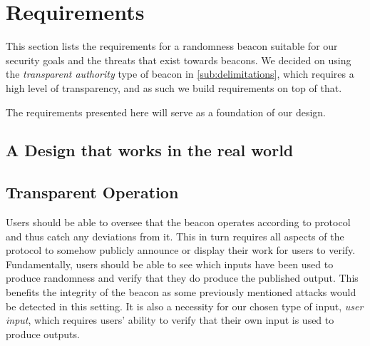 \section{Requirements}%
\label{sec:beacon_requirements}
This section lists the requirements for a randomness beacon suitable for our security goals and the threats that exist towards beacons.
We decided on using the \emph{transparent authority} type of beacon in \cref{sub:delimitations}, which requires a high level of transparency, and as such we build requirements on top of that.

The requirements presented here will serve as a foundation of our design.






\subsection{A Design that works in the real world}

\subsection{Transparent Operation}

Users should be able to oversee that the beacon operates according to protocol and thus catch any deviations from it.
This in turn requires all aspects of the protocol to somehow publicly announce or display their work for users to verify.
Fundamentally, users should be able to see which inputs have been used to produce randomness and verify that they do produce the published output.
This benefits the integrity of the beacon as some previously mentioned attacks would be detected in this setting.
It is also a necessity for our chosen type of input, \emph{user input}, which requires users' ability to verify that their own input is used to produce outputs.

